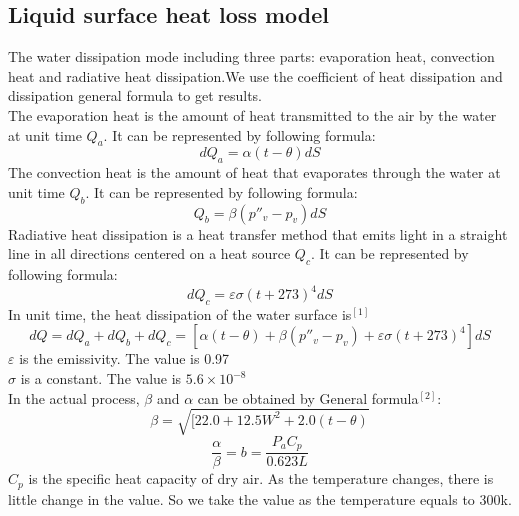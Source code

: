 \documentclass{mcmthesis}
\begin{document}
\subsection{Liquid surface heat loss model}
\indent The water dissipation mode including three parts: evaporation heat, convection heat and radiative heat dissipation.We use the coefficient of heat dissipation and dissipation general formula to get results.
\\
\indent The evaporation heat is the amount of heat transmitted to the air by the water at unit time $Q_{a}$. It can be represented by following formula:
\begin{equation}
	dQ_{a}=\alpha (t-\theta)dS
\end{equation}
\indent The convection heat is the amount of heat that evaporates through the water at unit time $Q_{b}$. It can be represented by following formula:
\begin{equation}
	Q_{b}=\beta ({p}''_{v}-p_{v})dS
\end{equation}
\indent Radiative heat dissipation is a heat transfer method that emits light in a straight line in all directions centered on a heat source $Q_{c}$.  It can be represented by following formula:
\begin{equation}
	dQ_{c}=\varepsilon \sigma (t+273)^{4}dS
\end{equation}
\indent In unit time, the heat dissipation of the water surface is$^{[1]}$
\begin{equation}
 dQ=dQ_{a}+dQ_{b}+dQ_{c}=[\alpha (t-\theta)+\beta ({p}''_{v}-p_{v})+\varepsilon \sigma (t+273)^{4}]dS 
\end{equation}
\indent \indent \indent $\varepsilon$ is the emissivity. The value is 0.97\\
\indent \indent \indent $\sigma$ is a constant. The value is $5.6\times 10^{-8}$\\
\indent \indent \indent In the actual process, $\beta$ and $\alpha$ can be obtained by General formula$^{[2]}$:\\
\begin{equation}
 \beta=\sqrt{[22.0+12.5W^{2}+2.0(t-\theta)}
\end{equation}
\begin{equation}
 \frac{\alpha}{\beta}=b=\frac{P_{a}C_{p}}{0.623L}
\end{equation}
\indent $C_{p}$ is the specific heat capacity of dry air. As the temperature changes, there is little change in the value. So we take the value as the temperature equals to 300k.\\
\end{document}
